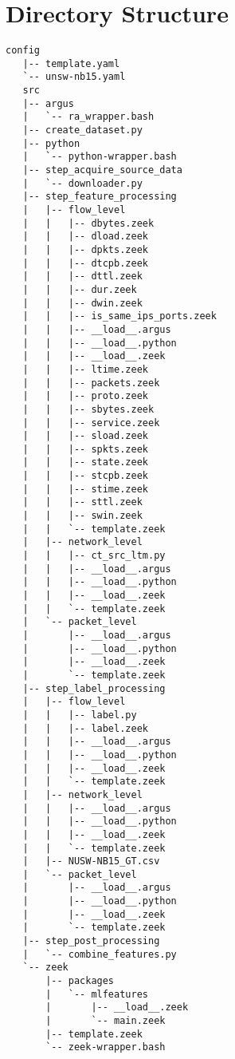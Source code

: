 \documentclass[sigconf, anonymous, screen, review]{acmart}
\begin{document}
\section{Directory Structure}
\begin{minipage}{\columnwidth}
\begin{lstlisting}[style=ascii-tree, label=lst:dirlisting, caption={
    A full directory listing of our source code used to implement the guidelines outlined in this paper.
    One can see how a large portion of the directory structure mirrors the structure of our YAML configuration files. 
    }, captionpos=b, basicstyle=\tiny, backgroundcolor=\color{gray!10!white}, frame=stb, breaklines=True]
   config
   |-- template.yaml
   `-- unsw-nb15.yaml
   src
   |-- argus
   |   `-- ra_wrapper.bash
   |-- create_dataset.py
   |-- python
   |   `-- python-wrapper.bash
   |-- step_acquire_source_data
   |   `-- downloader.py
   |-- step_feature_processing
   |   |-- flow_level
   |   |   |-- dbytes.zeek
   |   |   |-- dload.zeek
   |   |   |-- dpkts.zeek
   |   |   |-- dtcpb.zeek
   |   |   |-- dttl.zeek
   |   |   |-- dur.zeek
   |   |   |-- dwin.zeek
   |   |   |-- is_same_ips_ports.zeek
   |   |   |-- __load__.argus
   |   |   |-- __load__.python
   |   |   |-- __load__.zeek
   |   |   |-- ltime.zeek
   |   |   |-- packets.zeek
   |   |   |-- proto.zeek
   |   |   |-- sbytes.zeek
   |   |   |-- service.zeek
   |   |   |-- sload.zeek
   |   |   |-- spkts.zeek
   |   |   |-- state.zeek
   |   |   |-- stcpb.zeek
   |   |   |-- stime.zeek
   |   |   |-- sttl.zeek
   |   |   |-- swin.zeek
   |   |   `-- template.zeek
   |   |-- network_level
   |   |   |-- ct_src_ltm.py
   |   |   |-- __load__.argus
   |   |   |-- __load__.python
   |   |   |-- __load__.zeek
   |   |   `-- template.zeek
   |   `-- packet_level
   |       |-- __load__.argus
   |       |-- __load__.python
   |       |-- __load__.zeek
   |       `-- template.zeek
   |-- step_label_processing
   |   |-- flow_level
   |   |   |-- label.py
   |   |   |-- label.zeek
   |   |   |-- __load__.argus
   |   |   |-- __load__.python
   |   |   |-- __load__.zeek
   |   |   `-- template.zeek
   |   |-- network_level
   |   |   |-- __load__.argus
   |   |   |-- __load__.python
   |   |   |-- __load__.zeek
   |   |   `-- template.zeek
   |   |-- NUSW-NB15_GT.csv
   |   `-- packet_level
   |       |-- __load__.argus
   |       |-- __load__.python
   |       |-- __load__.zeek
   |       `-- template.zeek
   |-- step_post_processing
   |   `-- combine_features.py
   `-- zeek
       |-- packages
       |   `-- mlfeatures
       |       |-- __load__.zeek
       |       `-- main.zeek
       |-- template.zeek
       `-- zeek-wrapper.bash
\end{lstlisting}
\end{minipage}
\end{document}
